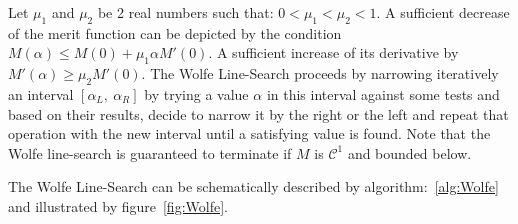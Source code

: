 


Let $\mu_1$ and $\mu_2$ be 2 real numbers such that: $0<\mu_1<\mu_2<1$.
A sufficient decrease of the merit function can be depicted by the condition $M(\alpha) \leq M(0) + \mu_1 \alpha M'(0)$.
A sufficient increase of its derivative by $M'(\alpha)\geq\mu_2 M'(0)$.
The Wolfe Line-Search proceeds by narrowing iteratively an interval $[\alpha_L,\ \alpha_R]$ by trying a value $\alpha$ in this interval against some tests and based on their results, decide to narrow it by the right or the left and repeat that operation with the new interval until a satisfying value is found.
Note that the Wolfe line-search is guaranteed to terminate if $M$ is $\mathcal{C}^1$ and bounded below.

The Wolfe Line-Search can be schematically described by algorithm:~\ref{alg:Wolfe} and illustrated by figure~\ref{fig:Wolfe}.

